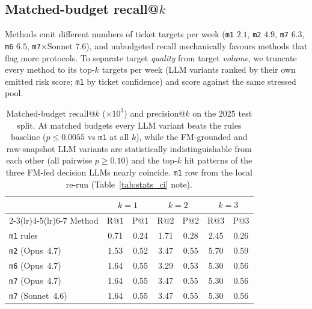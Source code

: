 \subsection{Matched-budget recall@$k$}
\label{app:stats-budget}

Methods emit different numbers of ticket targets per week
(\texttt{m1} $2.1$, \texttt{m2} $4.9$, \texttt{m7} $6.3$,
\texttt{m6} $6.5$, \texttt{m7}$\times$Sonnet $7.6$), and unbudgeted
recall mechanically favours methods that flag more protocols. To separate
target \emph{quality} from target \emph{volume}, we truncate every
method to its top-$k$ targets per week (LLM variants ranked by their
own emitted risk score; \texttt{m1} by ticket confidence) and score
against the same stressed pool.

\begin{table}[!htbp]
\centering
\footnotesize
\setlength{\tabcolsep}{4pt}
\caption{Matched-budget recall@$k$ ($\times 10^{3}$) and
precision@$k$ on the 2025 test split. At matched budgets every LLM
variant beats the rules baseline ($p\!\leq\!0.0055$ vs \texttt{m1}
at all $k$), while the FM-grounded and raw-snapshot LLM variants
are statistically indistinguishable from each other (all pairwise
$p\!\geq\!0.10$) and the top-$k$ hit patterns of the three FM-fed
decision LLMs nearly coincide. \texttt{m1} row from the local
re-run (Table~\ref{tab:stats_ci} note).}
\label{tab:matched_budget}
\begin{tabular}{@{}lcccccc@{}}
\toprule
& \multicolumn{2}{c}{$k\!=\!1$} & \multicolumn{2}{c}{$k\!=\!2$} & \multicolumn{2}{c}{$k\!=\!3$} \\
\cmidrule(lr){2-3}\cmidrule(lr){4-5}\cmidrule(lr){6-7}
Method & R@1 & P@1 & R@2 & P@2 & R@3 & P@3 \\
\midrule
\texttt{m1} rules            & 0.71 & 0.24 & 1.71 & 0.28 & 2.45 & 0.26 \\
\texttt{m2} (Opus~4.7)       & 1.53 & 0.52 & 3.47 & 0.55 & 5.70 & 0.59 \\
\texttt{m6} (Opus~4.7)       & 1.64 & 0.55 & 3.29 & 0.53 & 5.30 & 0.56 \\
\texttt{m7} (Opus~4.7)       & 1.64 & 0.55 & 3.47 & 0.55 & 5.30 & 0.56 \\
\texttt{m7} (Sonnet~4.6)     & 1.64 & 0.55 & 3.47 & 0.55 & 5.30 & 0.56 \\
\bottomrule
\end{tabular}
\end{table}

